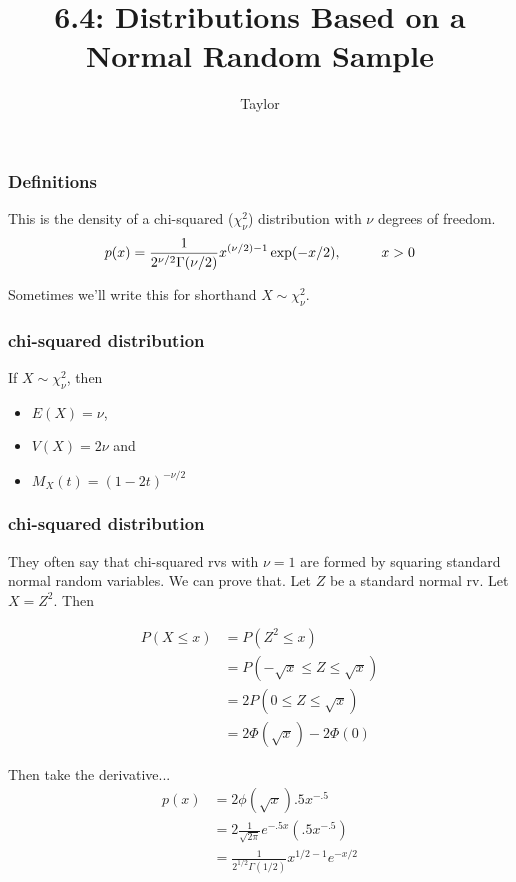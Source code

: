 \documentclass{beamer}
\title["6.4"]{6.4: Distributions Based on a Normal Random Sample}
\author{Taylor}
\institute[UVA] 
{
University of Virginia \\
\medskip
\textit{} %
}
\date{} %
\begin{document}

\begin{frame}
\titlepage 
\end{frame}

\begin{frame}
\frametitle{Definitions}

This is the density of a chi-squared ($\chi ^2 _{\nu}$) distribution with $\nu$ degrees of freedom. 
\[
p(x) = \frac{1}{2^{\nu/2} \Gamma(\nu /2 )} x^{(\nu / 2) - 1} \exp(-x/2), \hspace{10mm} x > 0
\]

Sometimes we'll write this for shorthand $X \sim \chi ^2 _{\nu}$.
\end{frame}




\begin{frame}
\frametitle{chi-squared distribution}

If $X \sim \chi ^2 _{\nu}$, then 
\begin{itemize}
\item $E(X) = \nu$, 
\item $V(X) = 2\nu$ and 
\item $M_X(t) = (1 - 2t)^{-\nu/2}$
\end{itemize}

\end{frame}


\begin{frame}
\frametitle{chi-squared distribution}

They often say that chi-squared rvs with $\nu = 1$ are formed by squaring standard normal random variables. We can prove that. Let $Z$ be a standard normal rv. Let $X = Z^2$. Then 

\begin{align*}
P(X \le x) &= P(Z^2 \le x) \\
&= P( -\sqrt{x} \le Z \le \sqrt{x}) \\
&= 2P(0 \le Z \le \sqrt{x}) \\
&= 2\Phi(\sqrt{x}) - 2\Phi(0)
\end{align*}

Then take the derivative...
\begin{align*}
p(x) &= 2 \phi(\sqrt{x}).5 x^{-.5} \\
&= 2 \frac{1}{\sqrt{2 \pi}} e ^{-.5x} (.5 x^{-.5}) \\
&= \frac{1}{2^{1/2} \Gamma(1/2)} x^{1/2 - 1} e^{-x/2}
\end{align*}

\end{frame}
\end{document}
